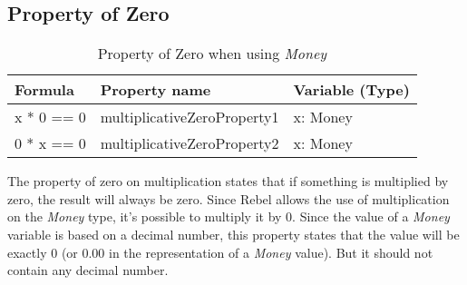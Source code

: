 \subsection*{Property of Zero}
\FloatBarrier
\begin{table}[!ht]
\centering
\begin{tabular}{lll}
\hline
                        \textbf{Formula} & \textbf{Property name}     & \textbf{Variable (Type)} \\ \hline
\rowcolor[HTML]{EFEFEF} x * 0 == 0       & multiplicativeZeroProperty1 & x: Money                 \\
                        0 * x == 0       & multiplicativeZeroProperty2 & x: Money                 \\ \hline
\end{tabular}
\caption{Property of Zero when using \textit{Money}}
\label{tbl:ch4_money_propertyzero}
\end{table}
\FloatBarrier
The property of zero on multiplication states that if something is multiplied by zero, the result will always be zero. Since Rebel allows the use of multiplication on the \textit{Money} type, it's possible to multiply it by 0. Since the value of a \textit{Money} variable is based on a decimal number, this property states that the value will be exactly 0 (or 0.00 in the representation of a \textit{Money} value). But it should not contain any decimal number. 

